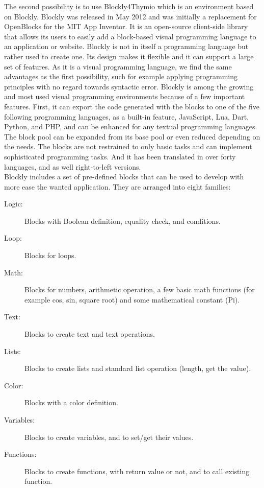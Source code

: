 \documentclass{scrartcl}
\begin{document}
The second possibility is to use Blockly4Thymio which is an environment based on Blockly. Blockly was released in May 2012 and was initially a replacement for OpenBlocks for the MIT App Inventor. 
It is an open-source client-side library that allows its users to easily add a block-based visual programming language to an application or website. 
Blockly is not in itself a programming language but rather used to create one. Its design makes it flexible and it can support a large set of features. 
As it is a visual programming language, we find the same advantages as the first possibility, such for example applying programming principles with no regard towards syntactic error.
Blockly is among the growing and most used visual programming environments because of a few important features. First, it can export the code generated with the blocks to one of the five following programming languages, 
as a built-in feature, JavaScript, Lua, Dart, Python, and PHP, and can be enhanced for any textual programming languages. 
The block pool can be expanded from its base pool or even reduced depending on the needs. The blocks are not restrained to only basic tasks and can implement sophisticated programming tasks. 
And it has been translated in over forty languages, and as well right-to-left versions. \\

Blockly includes a set of pre-defined blocks that can be used to develop with more ease the wanted application. They are arranged into eight families:
\begin{description}
  \item [Logic:] Blocks with Boolean definition, equality check, and conditions.
  \item [Loop:] Blocks for loops.
  \item [Math:] Blocks for numbers, arithmetic operation, a few basic math functions (for example cos, sin, square root) and some mathematical constant (Pi).
  \item [Text:] Blocks to create text and text operations.
  \item [Lists:] Blocks to create lists and standard list operation (length, get the value).
  \item [Color:] Blocks with a color definition.
  \item [Variables:] Blocks to create variables, and to set/get their values.
  \item [Functions:] Blocks to create functions, with return value or not, and to call existing function.
\end{description}
\end{document}
